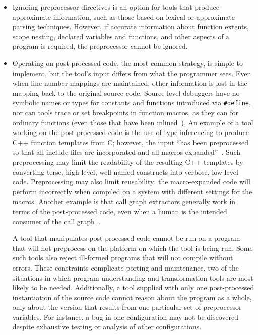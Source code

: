 \documentclass[10pt]{article}
\begin{document}
\begin{itemize}

\item Ignoring preprocessor directives is an option for tools that produce
  approximate information, such as those based on lexical or approximate
  parsing techniques.  However, if accurate information about function
  extents, scope nesting, declared variables and functions, and other
  aspects of a program is required, the preprocessor cannot be ignored.

\item Operating on post-processed code, the most common strategy, is
  simple to implement, but the tool's input differs from what the
  programmer sees.  Even when line number mappings are maintained,
  other information is lost in the mapping back to the original source
  code.  Source-level debuggers have no symbolic names or types for
  constants and functions introduced via {\tt \#define}, nor can tools
  trace or set breakpoints in function macros, as they can for
  ordinary functions (even those that have been
  inlined~\cite{Zellweger83:TR}).  An example of a tool working on the
  post-processed code is the use of type inferencing to produce C++
  function templates from C; however, the input ``has been
  preprocessed so that all include files are incorporated and all
  macros expanded''~\cite[p.~145]{Siff-fse96}.  Such preprocessing may
  limit the readability of the resulting C++ templates by converting
  terse, high-level, well-named constructs into verbose, low-level code.
  Preprocessing may also limit reusability:  the macro-expanded code will
  perform incorrectly when compiled on a system with different settings
  for the macros.  Another example is that call graph extractors generally
  work in terms of the post-processed code, even when a human is the
  intended consumer of the call graph~\cite{Murphy-icse18}.


  A tool that manipulates post-processed code cannot be run on a
  program that will not preprocess on the platform on which the tool
  is being run.  Some such tools also reject ill-formed programs
  that will not compile without errors.  These constraints complicate
  porting and maintenance, two of the situations in which program
  understanding and transformation tools are most likely to be needed.
  Additionally, a tool supplied with only one post-processed
  instantiation of the source code cannot reason about the program as
  a whole, only about the version that results from one particular set
  of preprocessor variables.  For instance, a bug in one configuration
  may not be discovered despite exhaustive testing or analysis of
  other configurations.




\end{itemize}
\end{document}

